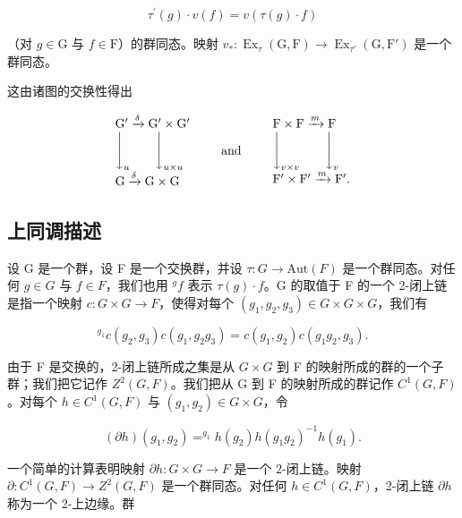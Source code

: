 \[
\tau^ {\prime} (g) \cdot v (f) = v (\tau (g) \cdot f)
\]

（对 \(g \in \mathrm{G}\) 与 \(f \in \mathrm{F}\)）的群同态。映射 \(v_{*} : \operatorname{Ex}_{\tau}(\mathrm{G}, \mathrm{F}) \to \operatorname{Ex}_{\tau'}(\mathrm{G}, \mathrm{F}')\) 是一个群同态。

这由诸图的交换性得出

\[
\begin{array}{l} \mathrm{G} ^ {\prime} \xrightarrow {\delta} \mathrm{G} ^ {\prime} \times \mathrm{G} ^ {\prime} \\ \Biggl \downarrow_ {u} \qquad \Biggl \downarrow_ {u \times u} \\ \mathrm{G} \xrightarrow {\delta} \mathrm{G} \times \mathrm{G} \end{array} \qquad \text {and} \qquad \begin{array}{l} \mathrm{F} \times \mathrm{F} \xrightarrow {m} \mathrm{F} \\ \Biggl \downarrow_ {v \times v} \qquad \Biggl \downarrow_ {v} \\ \mathrm{F} ^ {\prime} \times \mathrm{F} ^ {\prime} \xrightarrow {m} \mathrm{F} ^ {\prime}. \end{array}
\]

\subsection{上同调描述}

设 G 是一个群，设 F 是一个交换群，并设 \(\tau: G \to \text{Aut}(F)\) 是一个群同态。对任何 \(g \in G\) 与 \(f \in F\)，我们也用 \(^{g}f\) 表示 \(\tau(g) \cdot f\)。G 的取值于 F 的一个 2-闭上链是指一个映射 \(c: G \times G \to F\)，使得对每个 \((g_{1}, g_{2}, g_{3}) \in G \times G \times G\)，我们有

\[
{ } ^ { g _ { 1 } } c ( g _ { 2 } , g _ { 3 } ) c ( g _ { 1 } , g _ { 2 } g _ { 3 } ) = c ( g _ { 1 } , g _ { 2 } ) c ( g _ { 1 } g _ { 2 } , g _ { 3 } ) .\tag{7}
\]

由于 F 是交换的，2-闭上链所成之集是从 \(G \times G\) 到 F 的映射所成的群的一个子群；我们把它记作 \(Z^{2}(G,F)\)。我们把从 G 到 F 的映射所成的群记作 \(C^{1}(G,F)\)。对每个 \(h \in C^{1}(G,F)\) 与 \((g_{1}, g_{2}) \in G \times G\)，令

\[
(\partial h) (g _ {1}, g _ {2}) = ^ {g _ {1}} h (g _ {2}) h (g _ {1} g _ {2}) ^ {- 1} h (g _ {1}).\tag{8}
\]

一个简单的计算表明映射 \(\partial h: G \times G \to F\) 是一个 2-闭上链。映射 \(\partial: C^{1}(G, F) \to Z^{2}(G, F)\) 是一个群同态。对任何 \(h \in C^{1}(G, F)\)，2-闭上链 \(\partial h\) 称为一个 2-上边缘。群

